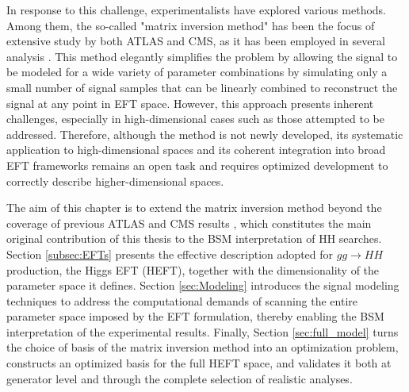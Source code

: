 In response to this challenge, experimentalists have explored various methods. Among them, the so-called "matrix inversion method" has been the focus of extensive study by both ATLAS and CMS, as it has been employed in several analysis \cite{ATLAS:2024pov,CMS_combination}. This method elegantly simplifies the problem by allowing the signal to be modeled for a wide variety of parameter combinations by simulating only a small number of signal samples that can be linearly combined to reconstruct the signal at any point in EFT space. However, this approach presents inherent challenges, especially in high-dimensional cases such as those attempted to be addressed. Therefore, although the method is not newly developed, its systematic application to high-dimensional spaces and its coherent integration into broad EFT frameworks remains an open task and requires optimized development to correctly describe higher-dimensional spaces.

The aim of this chapter is to extend the matrix inversion method beyond the coverage of previous ATLAS and CMS results \cite{ATLAS:2025tkn,CMS_combination}, which constitutes the main original contribution of this thesis to the BSM interpretation of HH searches. Section \ref{subsec:EFTs} presents the effective description adopted for $gg\to HH$ production, the Higgs EFT (HEFT), together with the dimensionality of the parameter space it defines. Section \ref{sec:Modeling} introduces the signal modeling techniques to address the computational demands of scanning the entire parameter space imposed by the EFT formulation, thereby enabling the BSM interpretation of the experimental results. Finally, Section \ref{sec:full_model} turns the choice of basis of the matrix inversion method into an optimization problem, constructs an optimized basis for the full HEFT space, and validates it both at generator level and through the complete selection of realistic analyses.




